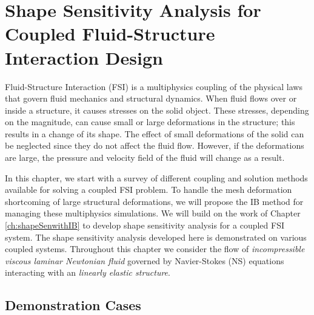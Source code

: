 \chapter{Shape Sensitivity Analysis for Coupled Fluid-Structure Interaction Design}\label{ch:FSIsen}
Fluid-Structure Interaction (FSI) is a multiphysics coupling of the physical laws that govern fluid mechanics and structural dynamics. When fluid flows over or inside a structure, it causes stresses on the solid object. These stresses, depending on the magnitude,  can cause small or large deformations in the structure; this results in a change of its shape. The effect of small deformations of the solid can be neglected since they do not affect the fluid flow. However, if the deformations are large, the pressure and velocity field of the fluid will change as a result.

In this chapter, we start with a survey of different coupling and solution methods available for solving a coupled FSI problem. To handle the mesh deformation shortcoming of large structural deformations, we will propose the IB method for managing these multiphysics simulations. We will build on the work of Chapter \ref{ch:shapeSenwithIB} to develop shape sensitivity analysis for a coupled FSI system. The shape sensitivity analysis developed here is demonstrated on various coupled systems. Throughout this chapter we consider the flow of \emph{incompressible viscous laminar Newtonian fluid} governed by Navier-Stokes (NS) equations interacting with an \emph{linearly elastic structure}. 



\section{Demonstration Cases}



